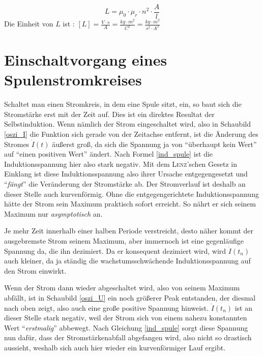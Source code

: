 \begin{equation}
L = \mu_0 \cdot \mu_r \cdot n^2 \cdot \frac{A}{l}
\end{equation}
Die Einheit von \(L\) ist : \([L] = \frac{V \cdot s}{A} = \frac{kg \cdot m^2}{C^2} = \frac{kg \cdot m^2}{s^2 \cdot A^2}\)



		\section{Einschaltvorgang eines Spulenstromkreises}
		\label{einschalt}

Schaltet man einen Stromkreis, in dem eine Spule sitzt, ein, so baut sich die Stromstärke erst mit der Zeit auf. Dies ist ein direktes Resultat der Selbstinduktion. Wenn nämlich der Strom eingeschaltet wird, also in Schaubild \ref{oszi_I} die Funktion sich gerade von der Zeitachse entfernt, ist die Änderung des Stromes \(\dot{I}(t)\) äußerst groß, da sich die Spannung ja von "`überhaupt kein Wert"' auf "`einen positiven Wert"' ändert. Nach Formel \ref{ind_spule} ist die Induktionsspannung hier also stark negativ. Mit dem \textsc{Lenz}'schen Gesetz in Einklang ist diese Induktionsspannung also ihrer Ursache entgegengesetzt und "`\textit{fängt}"' die Veränderung der Stromstärke ab. Der Stromverlauf ist deshalb an dieser Stelle auch kurvenförmig. Ohne die entgegengerichtete Induktionsspannung hätte der Strom sein Maximum praktisch sofort erreicht. So nährt er sich seinem Maximum nur \textit{asymptotisch} an.

Je mehr Zeit innerhalb einer halben Periode verstreicht, desto näher kommt der ausgebremste Strom seinem Maximum, aber immernoch ist eine gegenläufige Spannung da, die ihn dezimiert. Da er konsequent dezimiert wird, wird \(\dot{I}(t_n)\) auch kleiner, da ja ständig die wachstumsschwächende Induktionsspannung auf den Strom einwirkt.

Wenn der Strom dann wieder abgeschaltet wird, also von seinem Maximum abfällt, ist in Schaubild \ref{oszi_U} ein noch größerer Peak entstanden, der diesmal nach oben zeigt, also auch eine große positive Spannung hinweist. \(\dot{I}(t_n)\) ist an dieser Stelle stark negativ, weil der Strom sich von einem nahezu konstannten Wert "`\textit{erstmalig}"' abbewegt. Nach Gleichung \ref{ind_spule} sorgt diese Spannung nun dafür, dass der Stromstärkenabfall abgefangen wird, also nicht so drastisch aussieht, weshalb sich auch hier wieder ein kurvenförmiger Lauf ergibt.


